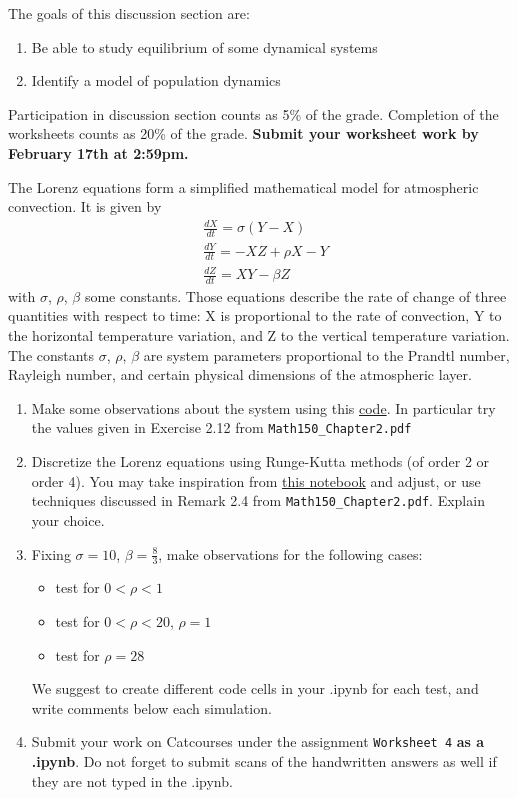 \documentclass[11pt]{article}
\begin{document}
The goals of this discussion section are: 

\begin{enumerate}
\item Be able to study equilibrium of some dynamical systems
\item Identify a model of population dynamics
\end{enumerate}

Participation in discussion section counts as 5\% of the grade. Completion of the worksheets counts as 20\% of the grade. \textbf{Submit your worksheet work by February 17th at 2:59pm.}

The Lorenz equations form a simplified mathematical model for atmospheric convection. It is given by
\[ \begin{aligned}
& \frac{dX}{dt} = \sigma(Y -X) \\
&  \frac{dY}{dt}=  - XZ + \rho X - Y \\
&  \frac{dZ}{dt} = XY - \beta Z
\end{aligned}\]
with $\sigma$, $\rho$, $\beta$ some constants.
Those equations describe the rate of change of three quantities with respect to time: X is proportional to the rate of convection, Y to the horizontal temperature variation, and Z to the vertical temperature variation. The constants $\sigma$, $\rho$, $\beta$ are system parameters proportional to the Prandtl number, Rayleigh number, and certain physical dimensions of the atmospheric layer.
\begin{enumerate}
\item Make some observations about the system using this \href{https://alpha.iodide.io/notebooks/2275/?viewMode=report}{code}. In particular try the values given in Exercise 2.12 from \texttt{Math150\_Chapter2.pdf}
\item Discretize the Lorenz equations using Runge-Kutta methods (of order 2 or order 4). You may take inspiration from \href{https://matplotlib.org/3.2.1/gallery/mplot3d/lorenz_attractor.html}{this notebook} and adjust, or use techniques discussed in Remark 2.4 from  \texttt{Math150\_Chapter2.pdf}. Explain your choice.
\item Fixing $\sigma = 10$, $\beta  = \frac{8}{3}$, make observations for the following cases:
\begin{itemize}
\item test for $0 < \rho <1$
\item test for $0 < \rho <20$, $\rho=1$
\item test for $\rho = 28$
\end{itemize}
We suggest to create different code cells in your .ipynb for each test, and write comments below each simulation.
\item Submit your work on Catcourses under the assignment \texttt{Worksheet 4} \textbf{as a .ipynb}. Do not forget to submit scans of the handwritten answers as well if they are not typed in the .ipynb.
\end{enumerate}
\end{document}
